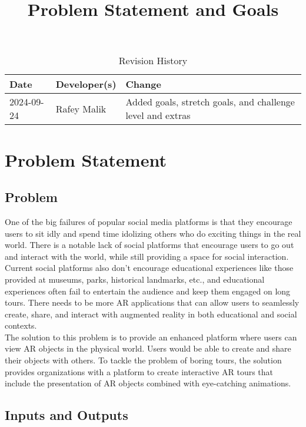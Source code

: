 \documentclass{article}
\title{Problem Statement and Goals\\\progname}
\author{\authname}
\date{}
\begin{document}
\maketitle

\begin{table}[hp]
\caption{Revision History} \label{TblRevisionHistory}
\begin{tabularx}{\textwidth}{llX}
\toprule
\textbf{Date} & \textbf{Developer(s)} & \textbf{Change}\\
\midrule
2024-09-24 & Rafey Malik & Added goals, stretch goals, and challenge level and extras\\
\bottomrule
\end{tabularx}
\end{table}

\section{Problem Statement}

\subsection{Problem}
One of the big failures of popular social media platforms is that they encourage users to sit idly and spend time idolizing others who do exciting things in the real world. There is a notable lack of social platforms that encourage users to go out and interact with the world, while still providing a space for social interaction. Current social platforms also don’t encourage educational experiences like those provided at museums, parks, historical landmarks, etc., and educational experiences often fail to entertain the audience and keep them engaged on long tours. There needs to be more AR applications that can allow users to seamlessly create, share, and interact with augmented reality in both educational and social contexts.\\
The solution to this problem is to provide an enhanced platform where users can view AR objects in the physical world. Users would be able to create and share their objects with others. To tackle the problem of boring tours, the solution provides organizations with a platform to create interactive AR tours that include the presentation of AR objects combined with eye-catching animations.

\subsection{Inputs and Outputs}
\end{document}
